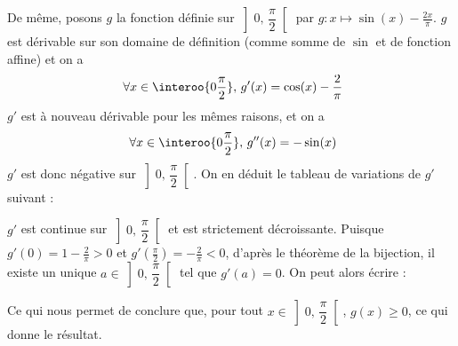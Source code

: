 {{De même, posons $g$ la fonction définie sur $\left] 0,\,\dfrac{\pi}{2}\right[$ par $g:x\mapsto \sin(x)-\frac{2x}{\pi}$. $g$ est dérivable sur son domaine de définition (comme somme de $\sin$ et de fonction affine) et on a \[ \forall x\in \interoo{0 \dfrac{\pi}{2}},\, g'(x) = \cos(x)-\frac{2}{\pi} \]
$g'$ est à nouveau dérivable pour les mêmes raisons, et on a
\[ \forall x\in \interoo{0 \dfrac{\pi}{2}},\, g''(x) = -\sin(x) \]
$g'$ est donc négative sur $\left] 0,\,\dfrac{\pi}{2}\right[$. On en déduit le tableau de variations de $g'$ suivant :
\begin{center}
\end{center}
$g'$ est continue sur $\left] 0,\,\dfrac{\pi}{2}\right[$ et est strictement décroissante. Puisque $g'(0)=1-\frac{2}{\pi}>0$ et $g'\left(\frac{\pi}{2}\right)=-\frac{2}{\pi}<0$, d'après le théorème de la bijection, il existe un unique $a\in \left]0,\,\dfrac{\pi}{2}\right[$ tel que $g'(a)=0$. On peut alors écrire :
\begin{center}
\end{center}
Ce qui nous permet de conclure que, pour tout $x\in \left] 0,\,\dfrac{\pi}{2}\right[$, $g(x)\geq 0$, ce qui donne le résultat.}
}

